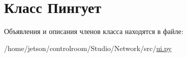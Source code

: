 \hypertarget{class_xD0_x9F_xD0_xB8_xD0_xBD_xD0_xB3_xD1_x83_xD0_xB5_xD1_x82}{}\section{Класс Пингует}
\label{class_xD0_x9F_xD0_xB8_xD0_xBD_xD0_xB3_xD1_x83_xD0_xB5_xD1_x82}


Объявления и описания членов класса находятся в файле\+:\begin{DoxyCompactItemize}
\item 
/home/jetson/controlroom/\+Studio/\+Network/src/\hyperlink{ui_8py}{ui.\+py}\end{DoxyCompactItemize}
